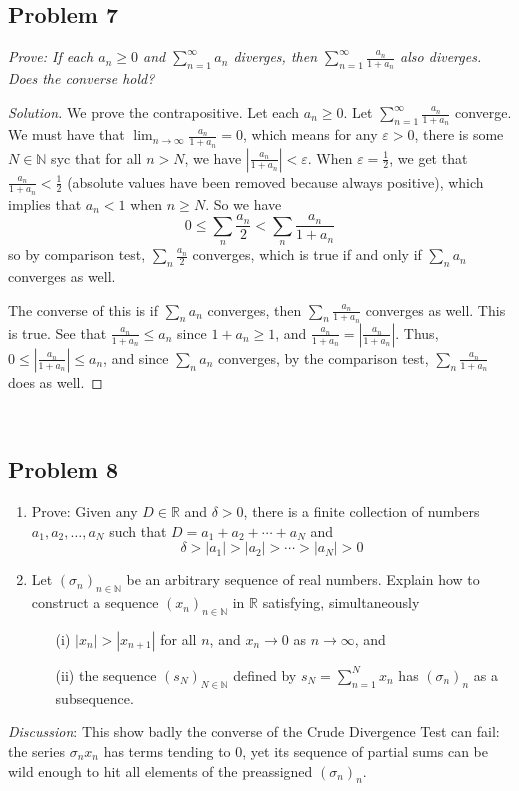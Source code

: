 \documentclass{article}
\newcommand{\N}{{\mathbb N}}
\newcommand{\R}{{\mathbb R}}
\newcommand{\ep}{{\varepsilon}}
\begin{document}
{\subsection*{Problem 7}
{\it Prove: If each $a_n \geq 0$ and $\sum_{n=1}^\infty a_n$ diverges,
then $\sum_{n=1}^\infty \frac{a_n}{1+a_n}$ also diverges.
Does the converse hold?}

\begin{proof}[Solution]\let\qed\relax
	We prove the contrapositive.
	Let each $a_n \geq 0$.
	Let $\sum_{n=1}^\infty \frac{a_n}{1+a_n}$ converge.
	We must have that $\lim_{n\to\infty}\frac{a_n}{1+a_n} = 0$,
	which means for any $\ep > 0$, there is some $N \in \N$
	syc that for all $n > N$, we have
	$\left|\frac{a_n}{1+a_n}\right| < \ep$.
	When $\ep = \frac{1}{2}$, we get that $\frac{a_n}{1+a_n} < \frac{1}{2}$
	(absolute values have been removed because always positive),
	which implies that $a_n < 1$ when $n \geq N$.
	So we have
	\[
		0 \leq \sum_n \frac{a_n}{2} < \sum_n \frac{a_n}{1+a_n}
	\]
	so by comparison test, $\sum_n\frac{a_n}{2}$ converges,
	which is true if and only if $\sum_n a_n$ converges as well.

	The converse of this is if $\sum_n a_n$ converges,
	then $\sum_n \frac{a_n}{1+a_n}$ converges as well.
	This is true.
	See that $\frac{a_n}{1+a_n} \leq a_n$ since $1 + a_n \geq 1$,
	and $\frac{a_n}{1+a_n} = \left\lvert \frac{a_n}{1+a_n}\right\rvert$.
	Thus, $0 \leq \left\lvert \frac{a_n}{1+a_n}\right\rvert \leq a_n$,
	and since $\sum_na_n$ converges,
	by the comparison test,
	$\sum_n \frac{a_n}{1+a_n}$ does as well.
\end{proof}
\clearpage
~\clearpage

\subsection*{Problem 8}
{\it
\begin{enumerate}
	\item Prove: Given any $D \in \R$ and $\delta > 0$,
		there is a finite collection of numbers $a_1,a_2,\dots,a_N$
		such that $D = a_1 + a_2 + \cdots + a_N$ and
		\[
			\delta > |a_1| > |a_2| > \cdots > |a_N| > 0
		\]
	\item Let $(\sigma_n)_{n\in\N}$ be an arbitrary sequence of real numbers.
		Explain how to construct a sequence $(x_n)_{n\in\N}$ in $\R$ satisfying, simultaneously
		\begin{enumerate}
			\item[(i)] $|x_n| > |x_{n+1}|$ for all $n$, and $x_n \to 0$ as $n \to \infty$, and
			\item[(ii)] the sequence $(s_N)_{N\in\N}$ defined by
				$s_N = \sum_{n=1}^N x_n$ has $(\sigma_n)_n$ as a subsequence.
		\end{enumerate}
\end{enumerate}
\emph{Discussion}: This show badly the converse of the Crude Divergence Test can fail:
the series $\sigma_n x_n$ has terms tending to $0$,
yet its sequence of partial sums can be wild enough to
hit all elements of the preassigned $(\sigma_n)_n$.

}}
\end{document}
